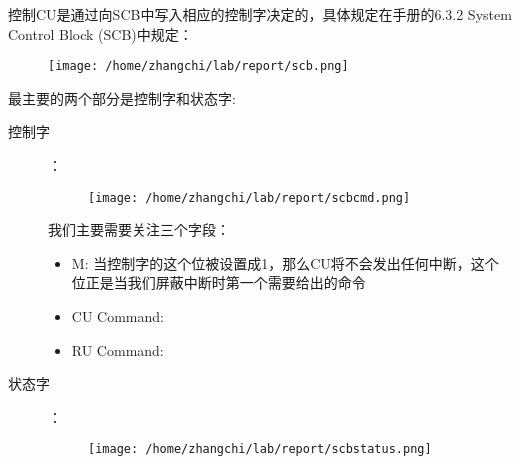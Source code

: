 \documentclass{article}
\begin{document}
\begin{CJK*}{UTF8}{gkai}
控制CU是通过向SCB中写入相应的控制字决定的，具体规定在手册的6.3.2 System Control Block (SCB)中规定：

\begin{figure}[htp]
\centering
\texttt{[image: /home/zhangchi/lab/report/scb.png]}
\end{figure}

最主要的两个部分是控制字和状态字:

\begin{description}
\item[控制字]：\\
\begin{figure}[htp]
\centering
\texttt{[image: /home/zhangchi/lab/report/scbcmd.png]}
\end{figure}

我们主要需要关注三个字段：

\begin{itemize}
\item{M: 当控制字的这个位被设置成1，那么CU将不会发出任何中断，这个位正是当我们屏蔽中断时第一个需要给出的命令}
\item{CU Command:}
\item{RU Command:}
\end{itemize}


\item[状态字]：\\
\begin{figure}[htp]
\centering
\texttt{[image: /home/zhangchi/lab/report/scbstatus.png]}
\end{figure}

\end{description}

\begin{lstlisting}[style=exercise]
\end{lstlisting}



\begin{lstlisting}[style=exercise]
\end{lstlisting}

\begin{lstlisting}[style=ccode, firstnumber=36, title={\scriptsize \ttfamily \bfseries kern/pci.c}]
\end{lstlisting}


\begin{lstlisting}[style=ccode, firstnumber=36, title={\scriptsize \ttfamily \bfseries kern/pci.c}]
\end{lstlisting}


\end{CJK*}
\end{document}
